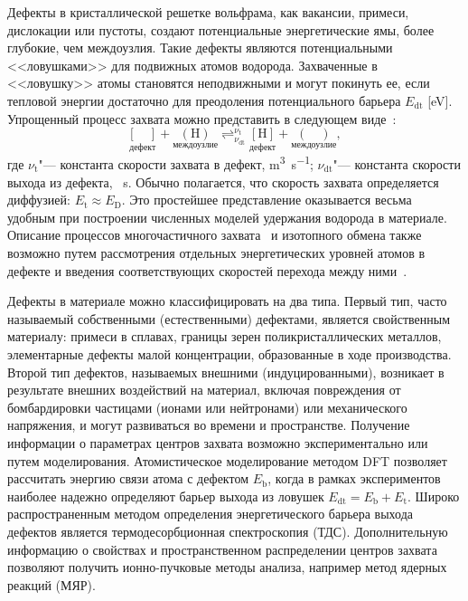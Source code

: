Дефекты в кристаллической решетке вольфрама, как вакансии, примеси, дислокации или пустоты, создают потенциальные энергетические ямы, более глубокие, чем междоузлия. Такие дефекты являются потенциальными <<ловушками>> для подвижных атомов водорода. Захваченные в <<ловушку>> атомы становятся неподвижными и могут покинуть ее, если тепловой энергии достаточно для преодоления потенциального барьера $E_\mathrm{dt}$ [\si{\electronvolt}]. Упрощенный процесс захвата можно представить в следующем виде~\cite{Drexler2020}:
\begin{equation*}
    \underset{\text{дефект}}{[\quad]} + \underset{\text{междоузлие}}{(\mathrm{H})} \mathop{\rightleftharpoons}^{\nu_\mathrm{t}}_{\nu_\mathrm{dt}}  \underset{\text{дефект}}{[\mathrm{H}]} +  \underset{\text{междоузлие}}{(\quad)},
\end{equation*}
где \( \nu_\mathrm{t} \)"--- константа скорости захвата в дефект, \si{\metre\cubed\per\second}; \( \nu_\mathrm{dt}\)"--- константа скорости выхода из дефекта, \si{\per\second}. Обычно полагается, что скорость захвата определяется диффузией: \( E_\mathrm{t} \approx E_\mathrm{D} \). Это простейшее представление оказывается весьма удобным при построении численных моделей удержания водорода в материале. Описание процессов многочастичного захвата~\cite{Johnson2010,Fernandez2015} и изотопного обмена также возможно путем рассмотрения отдельных энергетических уровней атомов в дефекте и введения соответствующих скоростей перехода между ними~\cite{Schmid2014}.


Дефекты в материале можно классифицировать на два типа. Первый тип, часто называемый собственными (естественными) дефектами, является свойственным материалу: примеси в сплавах, границы зерен поликристаллических металлов, элементарные дефекты малой концентрации, образованные в ходе производства. Второй тип дефектов, называемых внешними (индуцированными), возникает в результате внешних воздействий на материал, включая повреждения от бомбардировки частицами (ионами или нейтронами) или механического напряжения, и могут развиваться во времени и пространстве. Получение информации о параметрах центров захвата возможно экспериментально или путем моделирования. Атомистическое моделирование методом DFT позволяет рассчитать энергию связи атома с дефектом \( E_\mathrm{b} \), когда в рамках экспериментов наиболее надежно определяют барьер выхода из ловушек \( E_\mathrm{dt}=E_\mathrm{b} + E_\mathrm{t} \). Широко распространенным методом определения энергетического барьера выхода дефектов является термодесорбционная спектроскопия (ТДС). Дополнительную информацию о свойствах и пространственном распределении центров захвата позволяют получить ионно-пучковые методы анализа, например метод ядерных реакций (МЯР). 

